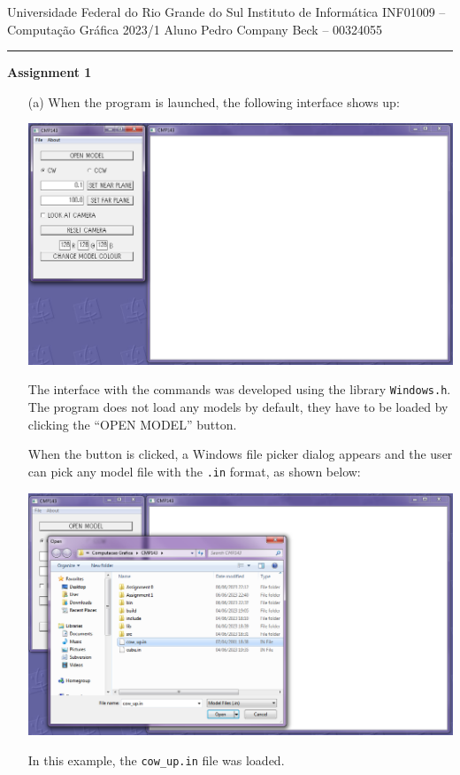 \documentclass[12pt]{article}
\begin{document}
\noindent
Universidade Federal do Rio Grande do Sul \hfill Instituto de Informática \newline 
INF01009 -- Computação Gráfica \hfill 2023/1 \newline
Aluno \hfill Pedro Company Beck -- 00324055
\rule{\linewidth}{1.pt}

\begin{center}
	\LARGE\textbf{Assignment 1} 
\end{center}

\begin{itemize}
\item[(a)]
When the program is launched, the following interface shows up:
\begin{center}
	\includegraphics[scale=0.5]{1.png}
\end{center}
The interface with the commands was developed using the library \texttt{Windows.h}. The program does not load any models by default, they have to be loaded by clicking the ``OPEN MODEL'' button.

When the button is clicked, a Windows file picker dialog appears and the user can pick any model file with the \texttt{.in} format, as shown below:
\begin{center}
	\includegraphics[scale=0.5]{2.png}
\end{center}
In this example, the \texttt{cow\_up.in} file was loaded.


\end{itemize}
\end{document}
